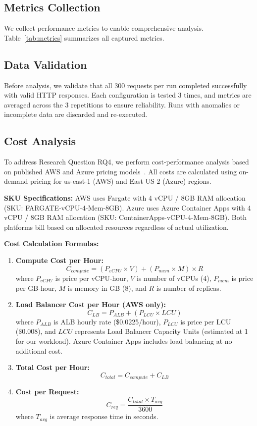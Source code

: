 \subsection{Metrics Collection}

We collect performance metrics to enable comprehensive analysis. Table~\ref{tab:metrics} summarizes all captured metrics.

\subsection{Data Validation}

Before analysis, we validate that all 300 requests per run completed successfully with valid HTTP responses. Each configuration is tested 3 times, and metrics are averaged across the 3 repetitions to ensure reliability. Runs with anomalies or incomplete data are discarded and re-executed.

\subsection{Cost Analysis}

To address Research Question RQ4, we perform cost-performance analysis based on published AWS and Azure pricing models~\cite{aws2023fargate_pricing, aws2023elb_pricing, aws2023ecr_pricing, azure2023containerapps_pricing, azure2023acr_pricing}. All costs are calculated using on-demand pricing for us-east-1 (AWS) and East US 2 (Azure) regions.

\textbf{SKU Specifications:} AWS uses Fargate with 4 vCPU / 8GB RAM allocation (SKU: FARGATE-vCPU-4-Mem-8GB). Azure uses Azure Container Apps with 4 vCPU / 8GB RAM allocation (SKU: ContainerApps-vCPU-4-Mem-8GB). Both platforms bill based on allocated resources regardless of actual utilization.

\textbf{Cost Calculation Formulas:}

\begin{enumerate}
    \item \textbf{Compute Cost per Hour:} 
    \[
    C_{compute} = (P_{vCPU} \times V) + (P_{mem} \times M) \times R
    \]
    where $P_{vCPU}$ is price per vCPU-hour, $V$ is number of vCPUs (4), $P_{mem}$ is price per GB-hour, $M$ is memory in GB (8), and $R$ is number of replicas.
    
    \item \textbf{Load Balancer Cost per Hour (AWS only):}
    \[
    C_{LB} = P_{ALB} + (P_{LCU} \times LCU)
    \]
    where $P_{ALB}$ is ALB hourly rate (\$0.0225/hour), $P_{LCU}$ is price per LCU (\$0.008), and $LCU$ represents Load Balancer Capacity Units (estimated at 1 for our workload). Azure Container Apps includes load balancing at no additional cost.
    
    \item \textbf{Total Cost per Hour:}
    \[
    C_{total} = C_{compute} + C_{LB}
    \]
    
    \item \textbf{Cost per Request:}
    \[
    C_{req} = \frac{C_{total} \times T_{avg}}{3600}
    \]
    where $T_{avg}$ is average response time in seconds.
\end{enumerate}

